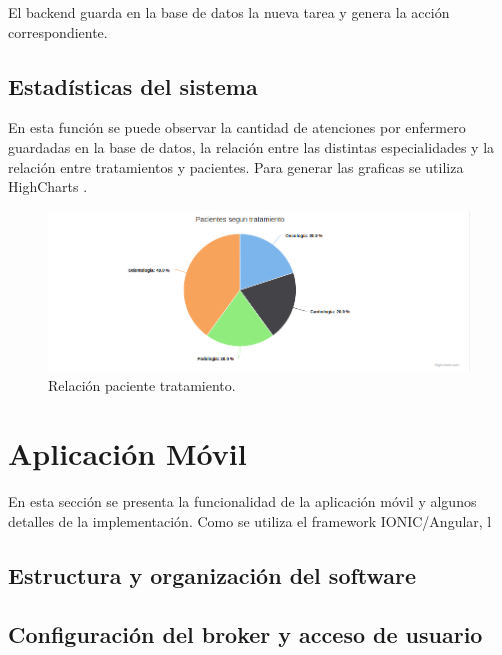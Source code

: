 El backend guarda en la base de datos la nueva tarea y genera la acción correspondiente.

\subsection{Estadísticas del sistema}

En esta función se puede observar la cantidad de atenciones por enfermero guardadas en la base de datos, la relación entre las distintas especialidades y la relación entre tratamientos y pacientes. Para generar las graficas se utiliza HighCharts \citep{WEBSITE:33}. 
\begin{figure}[ht]
	\centering
	\includegraphics[scale=.40]{./Figures/web/pacientes-Tratamiento.png}
	\caption{Relación paciente tratamiento.}
	\label{fig:Relación paciente tratamiento.}
\end{figure} 



\section{Aplicación Móvil}
En esta sección se presenta la funcionalidad de la aplicación móvil y algunos detalles de la implementación. Como se utiliza el framework IONIC/Angular, l

\subsection{Estructura y organización del software}
\pagebreak
\subsection{Configuración del broker y acceso de usuario}


